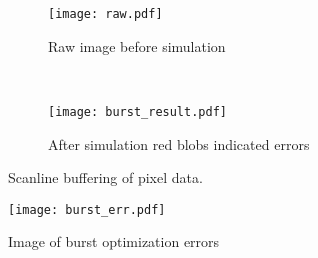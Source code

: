 \begin{figure}[H]
	\centering
	\begin{subfigure}[b]{0.5\textwidth}
		\texttt{[image: raw.pdf]}
		\caption{Raw image before simulation}
		\label{fig:raw_burst}
    \end{subfigure}%
        ~ %
    \begin{subfigure}[b]{0.5\textwidth}
    	\texttt{[image: burst\_result.pdf]}
    	\caption{After simulation red blobs indicated errors}
    	\label{fig:burst_picture_sobel}
	\end{subfigure}
	\caption{Scanline buffering of pixel data.}
    	\label{fig:burst_picture}
\end{figure}


\begin{figure}[H]
	\centering
	\texttt{[image: burst\_err.pdf]}
	\caption{Image of burst optimization errors}
	\label{fig:pic_burst_err}
\end{figure}